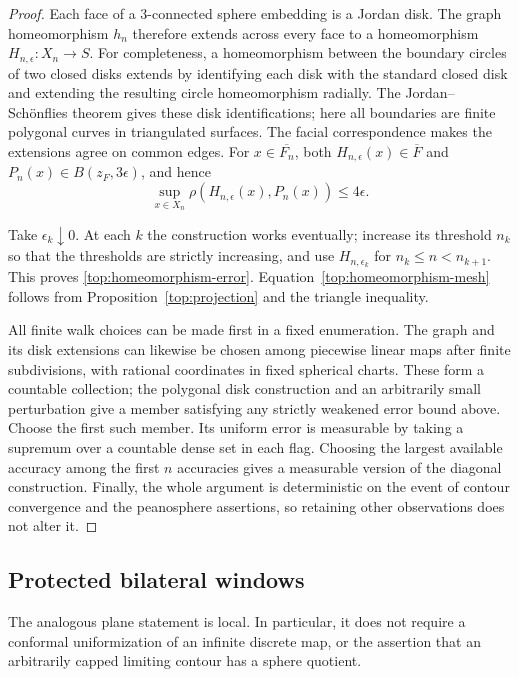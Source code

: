 \begin{proof}
Each face of a $3$-connected sphere embedding is a Jordan disk.
The graph homeomorphism $h_n$ therefore extends across every face
to a homeomorphism $H_{n,\epsilon}:X_n\to S$.
For completeness, a homeomorphism between the boundary circles of
two closed disks extends by identifying each disk with the standard
closed disk and extending the resulting circle homeomorphism
radially.  The Jordan--Sch\"onflies theorem gives these disk
identifications; here all boundaries are finite polygonal curves
in triangulated surfaces.  The facial correspondence makes the
extensions agree on common edges.  For $x\in\overline{F_n}$,
both $H_{n,\epsilon}(x)\in\overline F$ and
$P_n(x)\in B(z_F,3\epsilon)$, and hence
\[
 \sup_{x\in X_n}\rho(H_{n,\epsilon}(x),P_n(x))
 \le 4\epsilon.
\]

Take $\epsilon_k\downarrow0$.  At each $k$ the construction works
eventually; increase its threshold $n_k$ so that the thresholds are
strictly increasing, and use $H_{n,\epsilon_k}$ for
$n_k\le n<n_{k+1}$.  This proves
\eqref{top:homeomorphism-error}.  Equation~\eqref{top:homeomorphism-mesh}
follows from Proposition~\ref{top:projection} and the triangle
inequality.

All finite walk choices can be made first in a fixed enumeration.
The graph and its disk extensions can likewise be chosen among
piecewise linear maps after finite subdivisions, with rational
coordinates in fixed spherical charts.  These form a countable
collection; the polygonal disk construction and an arbitrarily
small perturbation give a member satisfying any strictly weakened
error bound above.  Choose the first such member.  Its uniform
error is measurable by taking a supremum over a countable dense
set in each flag.  Choosing the largest available accuracy among
the first $n$ accuracies gives a measurable version of the
diagonal construction.  Finally, the whole argument is
deterministic on the event of contour convergence and the
peanosphere assertions, so retaining other observations does not
alter it.
\end{proof}

\subsection{Protected bilateral windows}

The analogous plane statement is local.  In particular, it does not
require a conformal uniformization of an infinite discrete map, or the
assertion that an arbitrarily capped limiting contour has a sphere
quotient.

